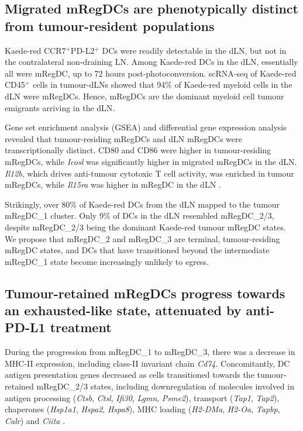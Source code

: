 \documentclass[11pt]{article}
\begin{document}
\subsection{Migrated mRegDCs are phenotypically distinct from tumour-resident populations}

Kaede-red CCR7$^+$PD-L2$^+$ DCs were readily detectable in the dLN, but not in the contralateral non-draining LN. Among Kaede-red DCs in the dLN, essentially all were mRegDC, up to 72 hours post-photoconversion. scRNA-seq of Kaede-red CD45$^+$ cells in tumour-dLNs showed that 94\% of Kaede-red myeloid cells in the dLN were mRegDCs. Hence, mRegDCs are the dominant myeloid cell tumour emigrants arriving in the dLN.

Gene set enrichment analysis (GSEA) and differential gene expression analysis revealed that tumour-residing mRegDCs and dLN mRegDCs were transcriptionally distinct. CD80 and CD86 were higher in tumour-residing mRegDCs, while \textit{Icosl} was significantly higher in migrated mRegDCs in the dLN. \textit{Il12b}, which drives anti-tumour cytotoxic T cell activity, was enriched in tumour mRegDCs, while \textit{Il15ra} was higher in mRegDC in the dLN \citep{riley2002}.

Strikingly, over 80\% of Kaede-red DCs from the dLN mapped to the tumour mRegDC\_1 cluster. Only 9\% of DCs in the dLN resembled mRegDC\_2/3, despite mRegDC\_2/3 being the dominant Kaede-red tumour mRegDC states. We propose that mRegDC\_2 and mRegDC\_3 are terminal, tumour-residing mRegDC states, and DCs that have transitioned beyond the intermediate mRegDC\_1 state become increasingly unlikely to egress.

\subsection{Tumour-retained mRegDCs progress towards an exhausted-like state, attenuated by anti-PD-L1 treatment}

During the progression from mRegDC\_1 to mRegDC\_3, there was a decrease in MHC-II expression, including class-II invariant chain \textit{Cd74}. Concomitantly, DC antigen presentation genes decreased as cells transitioned towards the tumour-retained mRegDC\_2/3 states, including downregulation of molecules involved in antigen processing (\textit{Ctsb}, \textit{Ctsl}, \textit{Ifi30}, \textit{Lgmn}, \textit{Psme2}), transport (\textit{Tap1}, \textit{Tap2}), chaperones (\textit{Hsp1a1}, \textit{Hspa2}, \textit{Hspa8}), MHC loading (\textit{H2-DMa}, \textit{H2-Oa}, \textit{Tapbp}, \textit{Calr}) and \textit{Ciita} \citep{chang1995}.
\end{document}

